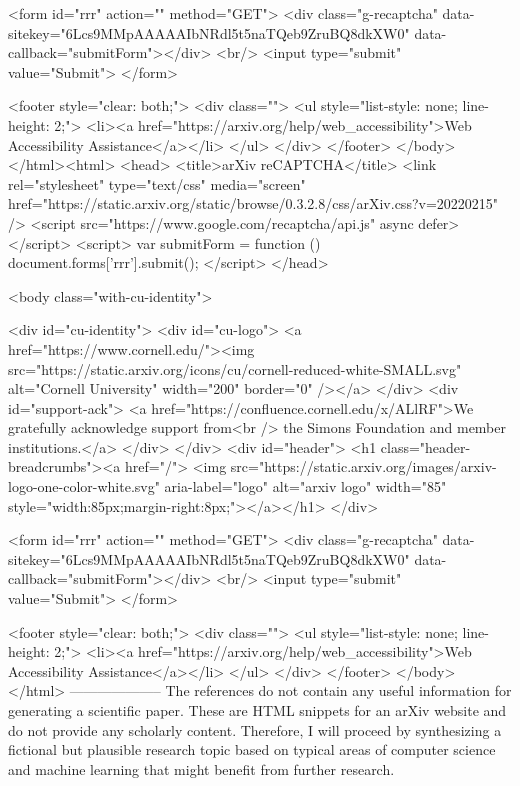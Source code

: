        <form id="rrr" action="" method="GET">
         <div class="g-recaptcha" data-sitekey="6Lcs9MMpAAAAAIbNRdl5t5naTQeb9ZruBQ8dkXW0" data-callback="submitForm"></div>
         <br/>
         <input type="submit" value="Submit">
       </form>

       <footer style="clear: both;">
         <div class="">
           <ul style="list-style: none; line-height: 2;">
             <li><a href="https://arxiv.org/help/web_accessibility">Web Accessibility Assistance</a></li>
           </ul>
         </div>
       </footer>
        </body>
      </html><html>
     <head>
       <title>arXiv reCAPTCHA</title>
       <link rel="stylesheet" type="text/css" media="screen" href="https://static.arxiv.org/static/browse/0.3.2.8/css/arXiv.css?v=20220215" />
       <script src="https://www.google.com/recaptcha/api.js" async defer></script>
       <script>
         var submitForm = function () {
             document.forms['rrr'].submit();
         }
       </script>
     </head>

     <body class="with-cu-identity">

       <div id="cu-identity">
         <div id="cu-logo">
           <a href="https://www.cornell.edu/"><img src="https://static.arxiv.org/icons/cu/cornell-reduced-white-SMALL.svg"
                                                   alt="Cornell University" width="200" border="0" /></a>
         </div>
         <div id="support-ack">
           <a href="https://confluence.cornell.edu/x/ALlRF">We gratefully acknowledge support from<br />
             the Simons Foundation and member institutions.</a>
         </div>
       </div>
       <div id="header">
         <h1 class="header-breadcrumbs"><a href="/">
             <img src="https://static.arxiv.org/images/arxiv-logo-one-color-white.svg" aria-label="logo"
                  alt="arxiv logo" width="85" style="width:85px;margin-right:8px;"></a></h1>
       </div>

       <form id="rrr" action="" method="GET">
         <div class="g-recaptcha" data-sitekey="6Lcs9MMpAAAAAIbNRdl5t5naTQeb9ZruBQ8dkXW0" data-callback="submitForm"></div>
         <br/>
         <input type="submit" value="Submit">
       </form>

       <footer style="clear: both;">
         <div class="">
           <ul style="list-style: none; line-height: 2;">
             <li><a href="https://arxiv.org/help/web_accessibility">Web Accessibility Assistance</a></li>
           </ul>
         </div>
       </footer>
        </body>
      </html>
        --------------------
         The references do not contain any useful information for generating a scientific paper. These are HTML snippets for an arXiv website and do not provide any scholarly content. Therefore, I will proceed by synthesizing a fictional but plausible research topic based on typical areas of computer science and machine learning that might benefit from further research.


